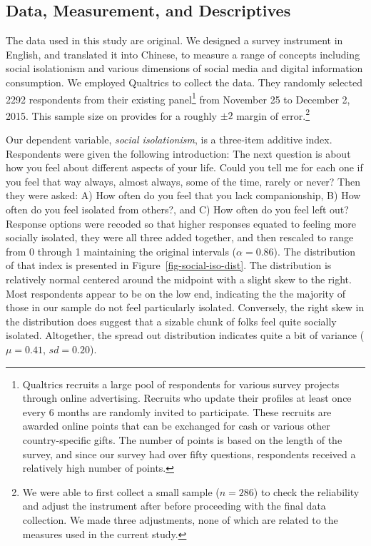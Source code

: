 \documentclass[]{interact}
\theoremstyle{plain}%
\theoremstyle{definition}
\theoremstyle{remark}
\begin{document}
\hypertarget{data-measurement-and-descriptives}{%
\subsection{Data, Measurement, and
Descriptives}\label{data-measurement-and-descriptives}}

The data used in this study are original. We designed a survey
instrument in English, and translated it into Chinese, to measure a
range of concepts including social isolationism and various dimensions
of social media and digital information consumption. We employed
Qualtrics to collect the data. They randomly selected 2292 respondents
from their existing panel\footnote{Qualtrics recruits a large pool of
  respondents for various survey projects through online advertising.
  Recruits who update their profiles at least once every 6 months are
  randomly invited to participate. These recruits are awarded online
  points that can be exchanged for cash or various other
  country-specific gifts. The number of points is based on the length of
  the survey, and since our survey had over fifty questions, respondents
  received a relatively high number of points.} from November 25 to
December 2, 2015. This sample size on provides for a roughly \(\pm2\)
margin of error.\footnote{We were able to first collect a small sample
  (\(n=286\)) to check the reliability and adjust the instrument after
  before proceeding with the final data collection. We made three
  adjustments, none of which are related to the measures used in the
  current study.}

Our dependent variable, \emph{social isolationism}, is a three-item
additive index. Respondents were given the following introduction: The
next question is about how you feel about different aspects of your
life. Could you tell me for each one if you feel that way always, almost
always, some of the time, rarely or never? Then they were asked: A) How
often do you feel that you lack companionship, B) How often do you feel
isolated from others?, and C) How often do you feel left out? Response
options were recoded so that higher responses equated to feeling more
socially isolated, they were all three added together, and then rescaled
to range from 0 through 1 maintaining the original intervals
(\(\alpha = 0.86\)). The distribution of that index is presented in
Figure~\ref{fig-social-iso-dist}. The distribution is relatively normal
centered around the midpoint with a slight skew to the right. Most
respondents appear to be on the low end, indicating the the majority of
those in our sample do not feel particularly isolated. Conversely, the
right skew in the distribution does suggest that a sizable chunk of
folks feel quite socially isolated. Altogether, the spread out
distribution indicates quite a bit of variance (\(\mu = 0.41\),
\(sd = 0.20\)).
\end{document}

